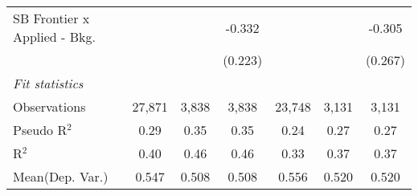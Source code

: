 \begin{tabular}{lcccccc}
   SB Frontier x Applied - Bkg.   &              &             & -0.332         &                &             & -0.305\\   
                                  &              &             & (0.223)        &                &             & (0.267)\\   
   \midrule
   \emph{Fit statistics}\\
   Observations                   & 27,871       & 3,838       & 3,838          & 23,748         & 3,131       & 3,131\\  
   Pseudo R$^2$                   & 0.29         & 0.35        & 0.35           & 0.24           & 0.27        & 0.27\\  
   R$^2$                          & 0.40         & 0.46        & 0.46           & 0.33           & 0.37        & 0.37\\  
Mean(Dep. Var.) & 0.547 & 0.508 & 0.508 & 0.556 & 0.520 & 0.520 \\
   

\end{tabular}
